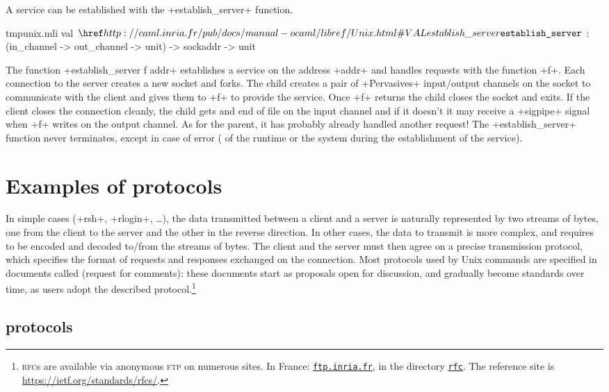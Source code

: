 A service can be established with the \ml+establish_server+ function.
%
\begin{listingcodefile}{tmpunix.mli}
val $\indexlibvalue{Unix}{establish\_server}$ :
  (in_channel -> out_channel -> unit) -> sockaddr -> unit
\end{listingcodefile}
% 
The function \ml+establish_server f addr+ establishes a service on the
address \ml+addr+ and handles requests with the function \ml+f+. Each
connection to the server creates a new socket and forks. The child
creates a pair of \ml+Pervasives+ input/output channels on the socket
to communicate with the client and gives them to \ml+f+ to provide the
service. Once \ml+f+ returns the child closes the socket and exits. If
the client closes the connection cleanly, the child gets and end of
file on the input channel and if it doesn't it may receive a
\ml+sigpipe+ signal when \ml+f+ writes on the output channel.  As for the
parent, it has probably already handled another request! The
\ml+establish_server+ function never terminates, except in
case of error (\eg{} of the {\ocaml} runtime or the system during
the establishment of the service).

\section{Examples of protocols}

In simple cases (\ml+rsh+, \ml+rlogin+, \ldots), the data transmitted
between a client and a server is naturally represented by two streams
of bytes, one from the client to the server and the other in the
reverse direction. In other cases, the data to transmit is more
complex, and requires to be encoded and decoded to/from the streams of
bytes. The client and the server must then agree on a precise
transmission protocol, which specifies the format of requests and
responses exchanged on the connection. Most protocols used by Unix
commands are specified in documents called 
(request for comments): these documents start as proposals open
for discussion, and gradually become standards over time, as users
adopt the described protocol.\footnote{\textsc{rfc}s are available
  via anonymous \textsc{ftp} on numerous sites. In France:
  \href{ftp://ftp.inria.fr}{\texttt{ftp.inria.fr}}, in the directory
  \href{ftp://ftp.inria.fr/pub/rfc/}{\texttt{rfc}}. The reference site
  is \url{https://ietf.org/standards/rfcs/}. }


\subsection*{ protocols}

